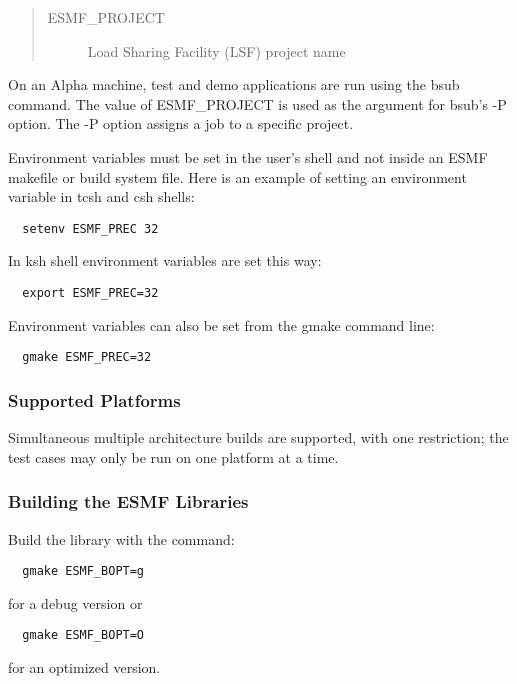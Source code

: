 \begin{quote}
\begin{description}
  \item[ESMF\_PROJECT] Load Sharing Facility (LSF) project name
\end{description}
\end{quote}

On an Alpha machine, test and demo applications are run using 
the bsub command.  The value of ESMF\_PROJECT is used as the 
argument for bsub's -P option. The -P option assigns a job to 
a specific project.  

Environment variables must be set in the user's shell and not
inside an ESMF makefile or build system file.  Here is an example 
of setting an environment variable in tcsh and csh shells:

\begin{verbatim}
  setenv ESMF_PREC 32
\end{verbatim}

In ksh shell environment variables are set this way:

\begin{verbatim}
  export ESMF_PREC=32
\end{verbatim}

Environment variables can also be set from the gmake command line:

\begin{verbatim}
  gmake ESMF_PREC=32
\end{verbatim}

\subsubsection{Supported Platforms}


Simultaneous multiple architecture builds are supported, with
one restriction; the test cases may only be run on one platform at a time. 

\subsubsection{Building the ESMF Libraries}
\label{BuildESMF}



Build the library with the command:
\begin{verbatim}
  gmake ESMF_BOPT=g  
\end{verbatim}
  for a debug version or
\begin{verbatim}
  gmake ESMF_BOPT=O  
\end{verbatim}
  for an optimized version.


